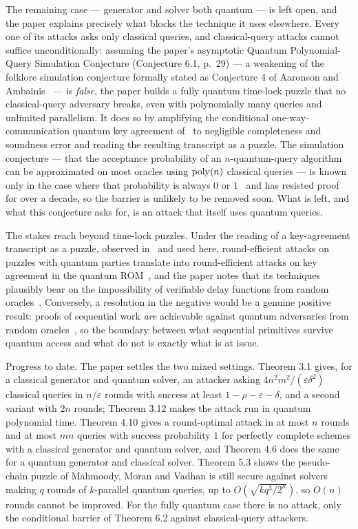 \documentclass{aicr-conjecture}
\begin{document}
The remaining case --- generator and solver both quantum --- is left open,
and the paper explains precisely what blocks the technique it uses
elsewhere. Every one of its attacks asks only classical queries, and
classical-query attacks cannot suffice unconditionally: assuming the
paper's asymptotic Quantum Polynomial-Query Simulation Conjecture
(Conjecture 6.1, p.~29) --- a weakening of the folklore simulation
conjecture formally stated as Conjecture 4 of Aaronson and
Ambainis~\cite{AA14} --- is \emph{false}, the paper builds a fully quantum
time-lock puzzle that no classical-query adversary breaks, even with
polynomially many queries and unlimited parallelism. It does so by
amplifying the conditional one-way-communication quantum key agreement
of~\cite{ACC22} to negligible completeness and soundness error and reading
the resulting transcript as a puzzle. The simulation conjecture --- that
the acceptance probability of an $n$-quantum-query algorithm can be
approximated on most oracles using $\mathrm{poly}(n)$ classical queries --- is
known only in the case where that probability is always $0$ or
$1$~\cite{OSSS05} and has resisted proof for over a decade, so the barrier
is unlikely to be removed soon. What is left, and what this conjecture asks
for, is an attack that itself uses quantum queries.

The stakes reach beyond time-lock puzzles. Under the reading of a
key-agreement transcript as a puzzle, observed in~\cite{MMV11} and used
here, round-efficient attacks on puzzles with quantum parties translate
into round-efficient attacks on key agreement in the quantum
ROM~\cite{ACC22}, and the paper notes that its techniques plausibly bear on
the impossibility of verifiable delay functions from random
oracles~\cite{MSW20}. Conversely, a resolution in the negative would be a
genuine positive result: proofs of sequential work \emph{are} achievable
against quantum adversaries from random oracles~\cite{CFHL21}, so the
boundary between what sequential primitives survive quantum access and what
do not is exactly what is at issue.

Progress to date. The paper settles the two mixed settings. Theorem 3.1
gives, for a classical generator and quantum solver, an attacker asking
$4n^{2}m^{2}/(\varepsilon\delta^{2})$ classical queries in $n/\varepsilon$
rounds with success at least $1 - \rho - \varepsilon - \delta$, and a second
variant with $2n$ rounds; Theorem 3.12 makes the attack run in quantum
polynomial time. Theorem 4.10 gives a round-optimal attack in at most $n$
rounds and at most $mn$ queries with success probability $1$ for perfectly
complete schemes with a classical generator and quantum solver, and Theorem
4.6 does the same for a quantum generator and classical solver. Theorem 5.3
shows the pseudo-chain puzzle of Mahmoody, Moran and Vadhan is still secure
against solvers making $q$ rounds of $k$-parallel quantum queries, up to
$O(\sqrt{kq^{3}/2^{\kappa}})$, so $O(n)$ rounds cannot be improved. For the
fully quantum case there is no attack, only the conditional barrier of
Theorem 6.2 against classical-query attackers.
\end{document}
